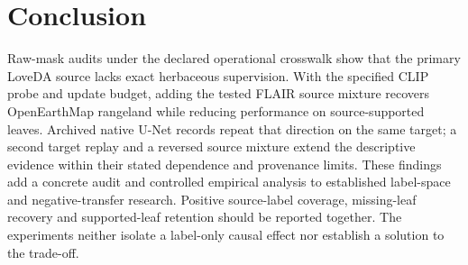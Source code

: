 \section{Conclusion}
\label{sec:conclusion}
Raw-mask audits under the declared operational crosswalk show that the primary LoveDA source lacks exact herbaceous supervision. With the specified CLIP probe and update budget, adding the tested FLAIR source mixture recovers OpenEarthMap rangeland while reducing performance on source-supported leaves. Archived native U-Net records repeat that direction on the same target; a second target replay and a reversed source mixture extend the descriptive evidence within their stated dependence and provenance limits. These findings add a concrete audit and controlled empirical analysis to established label-space and negative-transfer research. Positive source-label coverage, missing-leaf recovery and supported-leaf retention should be reported together. The experiments neither isolate a label-only causal effect nor establish a solution to the trade-off.
